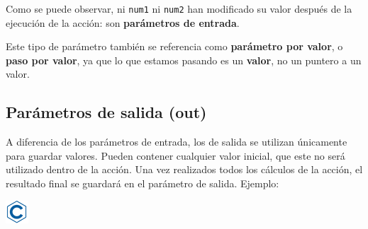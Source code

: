 \documentclass[
]{book}
\begin{document}
Como se puede observar, ni \texttt{num1} ni \texttt{num2} han modificado su valor después de la ejecución de la acción: son \textbf{parámetros de entrada}.

Este tipo de parámetro también se referencia como \textbf{parámetro por valor}, o \textbf{paso por valor}, ya que lo que estamos pasando es un \textbf{valor}, no un puntero a un valor.

\hypertarget{paruxe1metros-de-salida-out}{%
\subsection{Parámetros de salida (out)}\label{paruxe1metros-de-salida-out}}

A diferencia de los parámetros de entrada, los de salida se utilizan únicamente para guardar valores. Pueden contener cualquier valor inicial, que este no será utilizado dentro de la acción. Una vez realizados todos los cálculos de la acción, el resultado final se guardará en el parámetro de salida. Ejemplo:

\includegraphics{./img/c.png}
\end{document}
